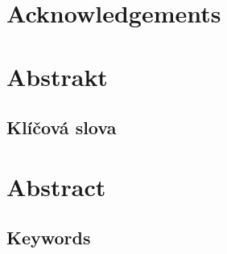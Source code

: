 \openright
\vspace*{\fill}
\section*{Acknowledgements}
\noindent
\Podekovani
\vspace{1cm}


\openright
\section*{Abstrakt}
\noindent
\Abstrakt
\subsection*{Klíčová slova}
\noindent
\KlicovaSlova

\bigskip\bigskip\bigskip
\section*{Abstract}
\noindent
\AbstraktEN
\subsection*{Keywords}
\noindent
\KlicovaSlovaEN

\openright
{}
